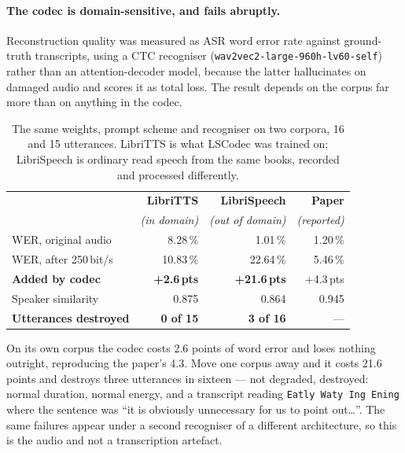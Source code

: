 \paragraph{The codec is domain-sensitive, and fails abruptly.}
Reconstruction quality was measured as ASR word error rate against
ground-truth transcripts, using a CTC recogniser
(\texttt{wav2vec2-large-960h-lv60-self}) rather than an
attention-decoder model, because the latter hallucinates on damaged
audio and scores it as total loss.  The result depends on the corpus
far more than on anything in the codec.

\begin{table}[H]
    \centering
    \caption{The same weights, prompt scheme and recogniser on two
             corpora, 16 and 15 utterances.  LibriTTS is what LSCodec
             was trained on; LibriSpeech is ordinary read speech from
             the same books, recorded and processed differently.}
    \label{tab:voice_domain}
    \small
    \begin{tabular}{@{}lrrr@{}}
    \toprule
    & \textbf{LibriTTS} & \textbf{LibriSpeech} & \textbf{Paper} \\
    & \emph{(in domain)} & \emph{(out of domain)} & \emph{(reported)} \\
    \midrule
    WER, original audio      & 8.28\,\% & 1.01\,\%  & 1.20\,\% \\
    WER, after 250\,bit/s    & 10.83\,\% & 22.64\,\% & 5.46\,\% \\
    \textbf{Added by codec}  & \textbf{+2.6\,pts} & \textbf{+21.6\,pts}
                             & +4.3\,pts \\
    Speaker similarity       & 0.875 & 0.864 & 0.945 \\
    \textbf{Utterances destroyed} & \textbf{0 of 15} & \textbf{3 of 16}
                             & --- \\
    \bottomrule
    \end{tabular}
\end{table}

On its own corpus the codec costs 2.6 points of word error and loses
nothing outright, reproducing the paper's 4.3.  Move one corpus away
and it costs 21.6 points and destroys three utterances in sixteen ---
not degraded, destroyed: normal duration, normal energy, and a
transcript reading \texttt{Eatly Waty Ing Ening} where the sentence
was ``it is obviously unnecessary for us to point out\ldots''.  The
same failures appear under a second recogniser of a different
architecture, so this is the audio and not a transcription artefact.

